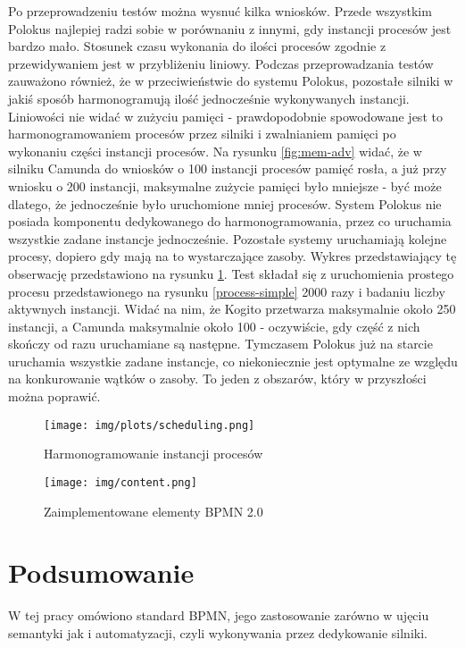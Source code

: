 \documentclass[declaration,shortabstract,mgr]{iithesis}
\newcommand{\bpmn}{BPMN }
\newcommand{\bpmnnospace}{BPMN}
\begin{document}
Po przeprowadzeniu testów można wysnuć kilka wniosków. Przede wszystkim Polokus najlepiej radzi sobie w porównaniu z innymi, gdy instancji procesów jest bardzo mało. Stosunek czasu wykonania do ilości procesów zgodnie z przewidywaniem jest w przybliżeniu liniowy. Podczas przeprowadzania testów zauważono również, że w przeciwieństwie do systemu Polokus, pozostałe silniki w jakiś sposób harmonogramują ilość jednocześnie wykonywanych instancji. Liniowości nie widać w zużyciu pamięci - prawdopodobnie spowodowane jest to harmonogramowaniem procesów przez silniki i zwalnianiem pamięci po wykonaniu części instancji procesów. Na rysunku \ref{fig:mem-adv} widać, że w silniku Camunda do wniosków o 100 instancji procesów pamięć rosła, a już przy wniosku o 200 instancji, maksymalne zużycie pamięci było mniejsze - być może dlatego, że jednocześnie było uruchomione mniej procesów. System Polokus nie posiada komponentu dedykowanego do harmonogramowania, przez co uruchamia wszystkie zadane instancje jednocześnie. Pozostałe systemy uruchamiają kolejne procesy, dopiero gdy mają na to wystarczające zasoby. Wykres przedstawiający tę obserwację przedstawiono na rysunku \ref{fig:scheduling}. Test składał się z uruchomienia prostego procesu przedstawionego na rysunku \ref{process-simple} 2000 razy i badaniu liczby aktywnych instancji. Widać na nim, że Kogito przetwarza maksymalnie około 250 instancji, a Camunda maksymalnie około 100 - oczywiście, gdy część z nich skończy od razu uruchamiane są następne. Tymczasem Polokus już na starcie uruchamia wszystkie zadane instancje, co niekoniecznie jest optymalne ze względu na konkurowanie wątków o zasoby. To jeden z obszarów, który w przyszłości można poprawić.

\begin{figure}[h]
     \centering
     \texttt{[image: img/plots/scheduling.png]}
     \caption{Harmonogramowanie instancji procesów}
     \label{fig:scheduling}
\end{figure}

\newpage
\begin{figure}[H]
    \texttt{[image: img/content.png]}
    \caption{Zaimplementowane elementy \bpmn 2.0}
    \label{fig:features}
\end{figure}

\chapter{Podsumowanie}
W tej pracy omówiono standard \bpmnnospace, jego zastosowanie zarówno w ujęciu semantyki jak i automatyzacji, czyli wykonywania przez dedykowanie silniki. 
\end{document}
